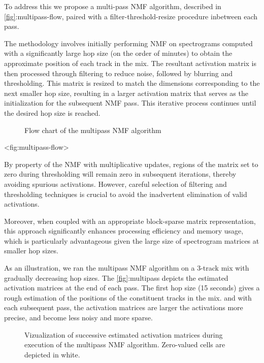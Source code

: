 To address this we propose a multi-pass NMF algorithm, described in
\hyperref[fig]{{[}fig{]}}:multipass-flow, paired with a
filter-threshold-resize procedure inbetween each pass.

The methodology involves initially performing NMF on spectrograms
computed with a significantly large hop size (on the order of minutes)
to obtain the approximate position of each track in the mix. The
resultant activation matrix is then processed through filtering to
reduce noise, followed by blurring and thresholding. This matrix is
resized to match the dimensions corresponding to the next smaller hop
size, resulting in a larger activation matrix that serves as the
initialization for the subsequent NMF pass. This iterative process
continues until the desired hop size is reached.

\begin{figure}
\centering

\caption{Flow chart of the multipass NMF algorithm}
\end{figure}

\textless fig:multipass-flow\textgreater{}

By property of the NMF with multiplicative updates, regions of the
matrix set to zero during thresholding will remain zero in subsequent
iterations, thereby avoiding spurious activations. However, careful
selection of filtering and thresholding techniques is crucial to avoid
the inadvertent elimination of valid activations.

Moreover, when coupled with an appropriate block-sparse matrix
representation, this approach significantly enhances processing
efficiency and memory usage, which is particularly advantageous given
the large size of spectrogram matrices at smaller hop sizes.

As an illustration, we ran the multipass NMF algorithm on a 3-track mix
with gradually decreasing hop sizes. The
\hyperref[fig]{{[}fig{]}}:multipass depicts the estimated activation
matrices at the end of each pass. The first hop size (15 seconds) gives
a rough estimation of the positions of the constituent tracks in the
mix. and with each subsequent pass, the activation matrices are larger
the activations more precise, and become less noisy and more sparse.

\begin{figure}
\centering

\caption{Vizualization of successive estimated activation matrices
during execution of the multipass NMF algorithm. Zero-valued cells are
depicted in white.}
\end{figure}

